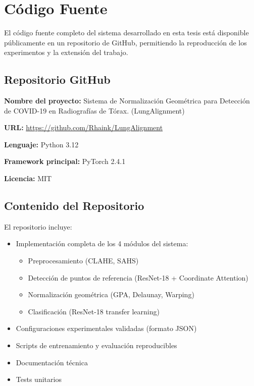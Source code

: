 \chapter{Código Fuente}
\label{anexo:codigo_fuente}

El código fuente completo del sistema desarrollado en esta tesis está disponible públicamente en un repositorio de GitHub, permitiendo la reproducción de los experimentos y la extensión del trabajo.

\section{Repositorio GitHub}

\textbf{Nombre del proyecto:} Sistema de Normalización Geométrica para Detección de COVID-19 en Radiografías de Tórax. (LungAlignment)

\textbf{URL:} \url{https://github.com/Rhaink/LungAlignment}

\textbf{Lenguaje:} Python 3.12

\textbf{Framework principal:} PyTorch 2.4.1

\textbf{Licencia:} MIT

\section{Contenido del Repositorio}

El repositorio incluye:

\begin{itemize}
    \item Implementación completa de los 4 módulos del sistema:
    \begin{itemize}
        \item Preprocesamiento (CLAHE, SAHS)
        \item Detección de puntos de referencia (ResNet-18 + Coordinate Attention)
        \item Normalización geométrica (GPA, Delaunay, Warping)
        \item Clasificación (ResNet-18 transfer learning)
    \end{itemize}
    \item Configuraciones experimentales validadas (formato JSON)
    \item Scripts de entrenamiento y evaluación reproducibles
    \item Documentación técnica
    \item Tests unitarios
\end{itemize}

